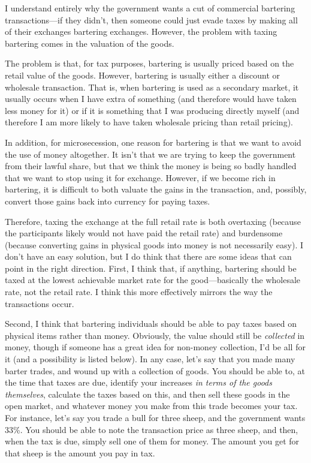 \begin{policynote}
I understand entirely why the government wants a cut of commercial 
bartering transactions---if they didn't,
then someone could just evade taxes by making all of their exchanges bartering exchanges.
However, the problem with taxing bartering comes in the valuation of the goods.

The problem is that, for tax purposes, bartering is usually priced based on the retail value
of the goods.  However, bartering is usually either a discount or wholesale transaction.
That is, when bartering is used as a secondary market, it usually occurs when I have extra
of something (and therefore would have taken less money for it) or if it is something
that I was producing directly myself (and therefore I am more likely to have taken 
wholesale pricing than retail pricing). 

In addition, for microsecession, one reason for bartering is that we want to avoid the
use of money altogether.  It isn't that we are trying to keep the government from their lawful
share, but that we think the money is being so badly handled that we want to stop
using it for exchange.  However, if we become rich in bartering, it is difficult to
both valuate the gains in the transaction, and, possibly, convert those gains back
into currency for paying taxes.

Therefore, taxing the exchange at the full retail rate is both overtaxing (because the 
participants likely would not have paid the retail rate) and burdensome (because converting
gains in physical goods into money is not necessarily easy).  I don't have an easy
solution, but I do think that there are some ideas that can point in the right direction.
First, I think that, if anything, bartering should be taxed at the lowest achievable market
rate for the good---basically the wholesale rate, not the retail rate.  I think this more
effectively mirrors the way the transactions occur.  

Second, I think that bartering individuals
should be able to pay taxes based on physical items rather than money.  Obviously, the
value should still be \textit{collected} in money, though if someone has a great
idea for non-money collection, I'd be all for it (and a possibility is listed below).  In any case, let's say that you made
many barter trades, and wound up with a collection of goods.  You should be able to,
at the time that taxes are due, identify your increases \textit{in terms of the goods themselves},
calculate the taxes based on this, and then sell these goods in the open market, and whatever
money you make from this trade becomes your tax.  For instance, let's say you trade a bull
for three sheep, and the government wants 33\%.  You should be able to note the transaction
price as three sheep, and then, when the tax is due, simply sell one of them for money.  The amount 
you get for that sheep is the amount you pay in tax.


\end{policynote}
